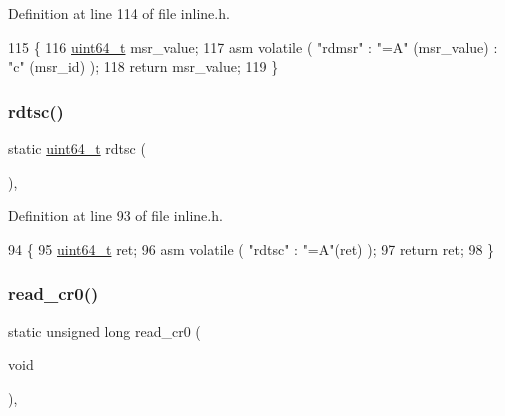 Definition at line 114 of file inline.\+h.


\begin{DoxyCode}
115 \{
116     \hyperlink{a00104_aa232ecf786a74ce5363c36c10798d2b1_aa232ecf786a74ce5363c36c10798d2b1}{uint64\_t} msr\_value;
117     \textcolor{keyword}{asm} \textcolor{keyword}{volatile} ( \textcolor{stringliteral}{"rdmsr"} : \textcolor{stringliteral}{"=A"} (msr\_value) : \textcolor{stringliteral}{"c"} (msr\_id) );
118     \textcolor{keywordflow}{return} msr\_value;
119 \}
\end{DoxyCode}
\mbox{\label{a00113_a47b9d70be3022fd0b5687d9794ca47bc_a47b9d70be3022fd0b5687d9794ca47bc}} 
\subsubsection{\texorpdfstring{rdtsc()}{rdtsc()}}
{\footnotesize\ttfamily static \hyperlink{a00104_aa232ecf786a74ce5363c36c10798d2b1_aa232ecf786a74ce5363c36c10798d2b1}{uint64\+\_\+t} rdtsc (\begin{DoxyParamCaption}{ }\end{DoxyParamCaption})\hspace{0.3cm}{\ttfamily [inline]}, {\ttfamily [static]}}



Definition at line 93 of file inline.\+h.


\begin{DoxyCode}
94 \{
95     \hyperlink{a00104_aa232ecf786a74ce5363c36c10798d2b1_aa232ecf786a74ce5363c36c10798d2b1}{uint64\_t} ret;
96     \textcolor{keyword}{asm} \textcolor{keyword}{volatile} ( \textcolor{stringliteral}{"rdtsc"} : \textcolor{stringliteral}{"=A"}(ret) );
97     \textcolor{keywordflow}{return} ret;
98 \}
\end{DoxyCode}
\mbox{\label{a00113_ac85e095222f364961e091702bb6bc2ff_ac85e095222f364961e091702bb6bc2ff}} 
\subsubsection{\texorpdfstring{read\+\_\+cr0()}{read\_cr0()}}
{\footnotesize\ttfamily static unsigned long read\+\_\+cr0 (\begin{DoxyParamCaption}\item[{void}]{ }\end{DoxyParamCaption})\hspace{0.3cm}{\ttfamily [inline]}, {\ttfamily [static]}}



